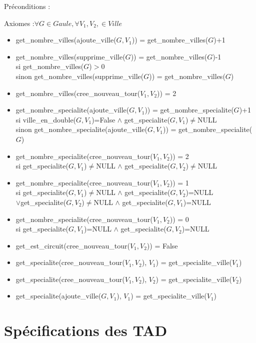 \documentclass[a4paper, 11pt, oneside]{article}
\begin{document}
\noindent Préconditions :

\noindent Axiomes :$\forall G \in Gaule, \forall V_1, V_2, \in Ville$
\begin{itemize}
    \item get\_nombre\_villes(ajoute\_ville($G, V_1$)) = get\_nombre\_villes($G$)+1
    \item get\_nombre\_villes(supprime\_ville($G$)) = get\_nombre\_villes($G$)-1 
    \\si get\_nombre\_villes($G$)$>0$ 
    \\sinon get\_nombre\_villes(supprime\_ville($G$)) = get\_nombre\_villes($G$)
    \item get\_nombre\_villes(cree\_nouveau\_tour($V_1, V_2$)) = 2
    \item get\_nombre\_specialite(ajoute\_ville($G, V_1$)) = get\_nombre\_specialite($G$)+1
    \\si ville\_en\_double($G, V_1$)=False $\wedge$ get\_specialite($G, V_1$)$\ne$NULL
    \\sinon get\_nombre\_specialite(ajoute\_ville($G, V_1$)) = get\_nombre\_specialite($G$)
    \item get\_nombre\_specialite(cree\_nouveau\_tour($V_1, V_2$)) = 2
    \\si get\_specialite($G, V_1$)$\ne$NULL $\wedge$ get\_specialite($G, V_2$)$\ne$NULL
    \item get\_nombre\_specialite(cree\_nouveau\_tour($V_1, V_2$)) = 1
    \\si get\_specialite($G, V_1$)$\ne$NULL $\wedge$ get\_specialite($G, V_2$)=NULL
    \\$\vee$get\_specialite($G, V_2$)$\ne$NULL $\wedge$ get\_specialite($G, V_1$)=NULL
    \item get\_nombre\_specialite(cree\_nouveau\_tour($V_1, V_2$)) = 0
    \\si get\_specialite($G, V_1$)=NULL $\wedge$ get\_specialite($G, V_2$)=NULL
    \item get\_est\_circuit(cree\_nouveau\_tour($V_1, V_2$)) = False
    \item get\_specialite(cree\_nouveau\_tour($V_1, V_2$), $V_1$) =  get\_specialite\_ville($V_1$)
    \item get\_specialite(cree\_nouveau\_tour($V_1, V_2$), $V_2$) =  get\_specialite\_ville($V_2$)
    \item get\_specialite(ajoute\_ville($G, V_1$), $V_1$) = get\_specialite\_ville($V_1$)
\end{itemize}

\section{\textbf{Spécifications des TAD}}
\end{document}
